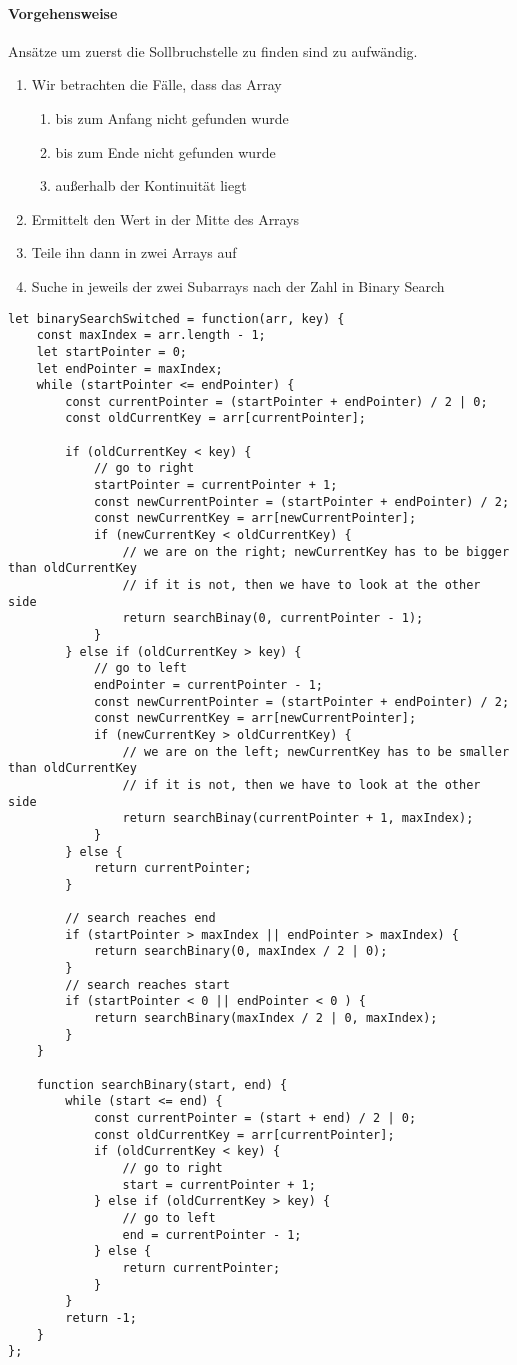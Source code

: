 \documentclass[babel]{book}
\begin{document}
\paragraph{Vorgehensweise}
Ansätze um zuerst die Sollbruchstelle zu finden sind zu aufwändig.

\begin{enumerate} 
	\item Wir betrachten die Fälle, dass das Array
	\begin{enumerate}
		\item bis zum Anfang nicht gefunden wurde
		\item bis zum Ende nicht gefunden wurde
		\item außerhalb der Kontinuität liegt
	\end{enumerate}
	\item Ermittelt den Wert in der Mitte des Arrays
	\item Teile ihn dann in zwei Arrays auf
	\item Suche in jeweils der zwei Subarrays nach der Zahl in Binary Search
\end{enumerate}

\begin{lstlisting}[caption=My Javascript Example]
let binarySearchSwitched = function(arr, key) {
	const maxIndex = arr.length - 1;
	let startPointer = 0;
	let endPointer = maxIndex;
	while (startPointer <= endPointer) {
		const currentPointer = (startPointer + endPointer) / 2 | 0;
		const oldCurrentKey = arr[currentPointer];
		
		if (oldCurrentKey < key) {
			// go to right
			startPointer = currentPointer + 1;
			const newCurrentPointer = (startPointer + endPointer) / 2;
			const newCurrentKey = arr[newCurrentPointer];
			if (newCurrentKey < oldCurrentKey) {
				// we are on the right; newCurrentKey has to be bigger than oldCurrentKey
				// if it is not, then we have to look at the other side
				return searchBinay(0, currentPointer - 1);
			}
		} else if (oldCurrentKey > key) {
			// go to left
			endPointer = currentPointer - 1;
			const newCurrentPointer = (startPointer + endPointer) / 2;
			const newCurrentKey = arr[newCurrentPointer];
			if (newCurrentKey > oldCurrentKey) {
				// we are on the left; newCurrentKey has to be smaller than oldCurrentKey
				// if it is not, then we have to look at the other side
				return searchBinay(currentPointer + 1, maxIndex);
			}
		} else {
			return currentPointer;
		}
	
		// search reaches end
		if (startPointer > maxIndex || endPointer > maxIndex) {
			return searchBinary(0, maxIndex / 2 | 0);
		}
		// search reaches start
		if (startPointer < 0 || endPointer < 0 ) {
			return searchBinary(maxIndex / 2 | 0, maxIndex);
		}
	}

	function searchBinary(start, end) {
		while (start <= end) {
			const currentPointer = (start + end) / 2 | 0;
			const oldCurrentKey = arr[currentPointer];
			if (oldCurrentKey < key) {
				// go to right
				start = currentPointer + 1;
			} else if (oldCurrentKey > key) {
				// go to left
				end = currentPointer - 1;
			} else {
				return currentPointer;
			}
		}
		return -1;
	}
};
\end{lstlisting}
\end{document}

